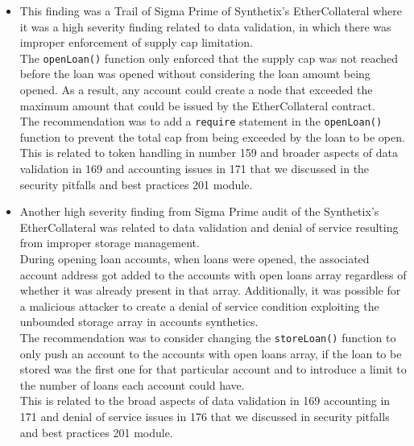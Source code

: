 \begin{itemize}
\item
  This finding was a Trail of Sigma Prime of Synthetix's EtherCollateral
  where it was a high severity finding related to data validation, in
  which there was improper enforcement of supply cap limitation.\\

  The \texttt{openLoan()} function only enforced that the supply cap was
  not reached before the loan was opened without considering the loan
  amount being opened. As a result, any account could create a node that
  exceeded the maximum amount that could be issued by the
  EtherCollateral contract.\\

  The recommendation was to add a \texttt{require} statement in the
  \texttt{openLoan()} function to prevent the total cap from being
  exceeded by the loan to be open.\\

  This is related to token handling in number 159 and broader aspects of
  data validation in 169 and accounting issues in 171 that we discussed
  in the security pitfalls and best practices 201 module.
\item
  Another high severity finding from Sigma Prime audit of the
  Synthetix's EtherCollateral was related to data validation and denial
  of service resulting from improper storage management.\\

  During opening loan accounts, when loans were opened, the associated
  account address got added to the accounts with open loans array
  regardless of whether it was already present in that array.
  Additionally, it was possible for a malicious attacker to create a
  denial of service condition exploiting the unbounded storage array in
  accounts synthetics.\\

  The recommendation was to consider changing the \texttt{storeLoan()}
  function to only push an account to the accounts with open loans
  array, if the loan to be stored was the first one for that particular
  account and to introduce a limit to the number of loans each account
  could have.\\

  This is related to the broad aspects of data validation in 169
  accounting in 171 and denial of service issues in 176 that we
  discussed in security pitfalls and best practices 201 module.
\end{itemize}

